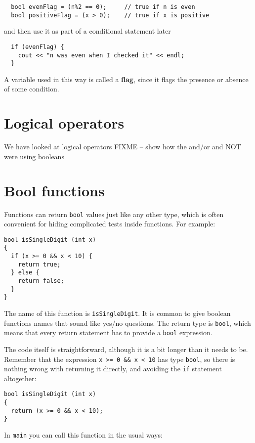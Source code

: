 \begin{verbatim}
  bool evenFlag = (n%2 == 0);     // true if n is even
  bool positiveFlag = (x > 0);    // true if x is positive
\end{verbatim}
%
and then use it as part of a conditional statement later

\begin{verbatim}
  if (evenFlag) {
    cout << "n was even when I checked it" << endl;
  }
\end{verbatim}
%
A variable used in this way is called a {\bf flag},
since it flags the presence or absence of some condition.


\section{Logical operators}
We have looked at logical operators 
FIXME -- show how the and/or and NOT were using booleans

\section{Bool functions}
\label{bool}

Functions can return {\tt bool} values just like any other type,
which is often convenient for hiding complicated tests inside
functions.  For example:

\begin{verbatim}
bool isSingleDigit (int x)
{
  if (x >= 0 && x < 10) {
    return true;
  } else {
    return false;
  }
}
\end{verbatim}
%
The name of this function is {\tt isSingleDigit}.  It is common
to give boolean functions names that sound like yes/no questions.
The return type is {\tt bool}, which means that every return
statement has to provide a {\tt bool} expression.

The code itself is straightforward, although it is a bit longer than
it needs to be.  Remember that the expression {\tt x >= 0 \&\& x < 10}
has type {\tt bool}, so there is nothing wrong with returning it
directly, and avoiding the {\tt if} statement altogether:

\begin{verbatim}
bool isSingleDigit (int x)
{
  return (x >= 0 && x < 10);
}
\end{verbatim}
%
In {\tt main} you can call this function in the usual ways:

